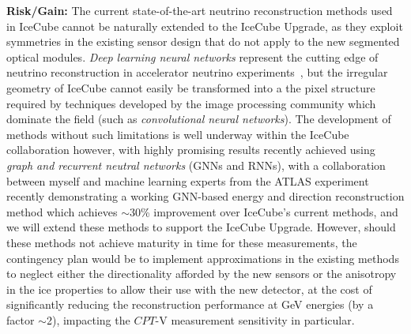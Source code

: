 \documentclass[a4paper,11pt]{article}
\begin{document}

\textbf{Risk/Gain:} The current state-of-the-art neutrino reconstruction methods used in IceCube cannot be naturally extended to the IceCube Upgrade, as they exploit symmetries in the existing sensor design that do not apply to the new segmented optical modules. \textit{Deep learning neural networks} represent the cutting edge of neutrino reconstruction in accelerator neutrino experiments~\cite{Baldi:2018qhe, Adams:2018bvi}, but the irregular geometry of IceCube cannot easily be transformed into a the pixel structure required by techniques developed by the image processing community which dominate the field (such as \textit{convolutional neural networks}). The development of methods without such limitations is well underway within the IceCube collaboration however, with highly promising results recently achieved using \textit{graph and recurrent neutral networks} (GNNs and RNNs), with a collaboration between myself and machine learning experts from the ATLAS experiment recently demonstrating a working GNN-based energy and direction reconstruction method which achieves $\sim$30\% improvement over IceCube's current methods, and we will extend these methods to support the IceCube Upgrade. However, should these methods not achieve maturity in time for these measurements, the contingency plan would be to implement approximations in the existing methods to neglect either the directionality afforded by the new sensors or the anisotropy in the ice properties to allow their use with the new detector, at the cost of significantly reducing the reconstruction performance at GeV energies (by a factor $\sim$2), impacting the $CPT$-V measurement sensitivity in particular. \\
\end{document}
